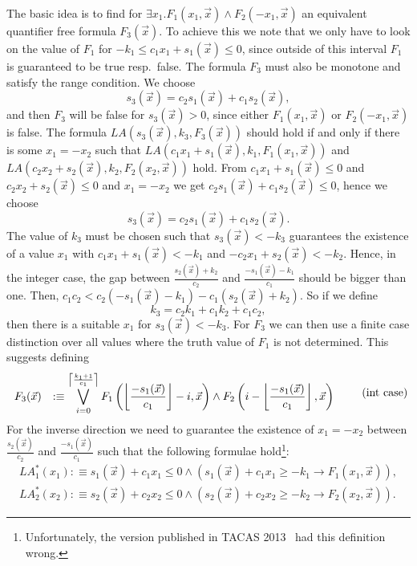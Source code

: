 \ifnewinterpolation The basic idea is to find for
 $\exists x_1. F_1(x_1, \vec x)\land F_2(-x_1, \vec x)$ an
equivalent quantifier free formula $F_3(\vec x)$.
To achieve this we note that we only have
to look on the value of $F_1$ for 
$-k_1 \leq c_1 x_1 + s_1(\vec x) \leq 0$,
since outside of this interval $F_1$ is guaranteed to be true
resp.\ false.  The formula $F_3$ must also be monotone and
satisfy the range condition.  We choose
\[ s_3(\vec x) = c_2 s_1(\vec x) + c_1s_2(\vec x), \]
and then $F_3$ will be false for $s_3(\vec x) > 0$, since either 
$F_1(x_1, \vec x)$ or $F_2(-x_1, \vec x)$ is false.
\else
The formula $LA(s_3(\vec x), k_3, F_3(\vec x))$ should
hold if and only if there is some $x_1=-x_2$ such that 
$LA(c_1x_1 + s_1(\vec x), k_1, F_1(x_1,\vec x))$ and 
$LA(c_2x_2 + s_2(\vec x), k_2, F_2(x_2,\vec x))$ hold.
From $c_1x_1 + s_1(\vec x) \leq 0$ and $c_2x_2+s_2(\vec x)\leq 0$ and $x_1=-x_2$ we get $c_2 s_1(\vec x) + c_1s_2(\vec x)\leq 0$, hence we choose
\[ s_3(\vec x) = c_2 s_1(\vec x) + c_1s_2(\vec x). \]
\fi
\ifnewinterpolation
The value of $k_3$ must be chosen such that $s_3(\vec x)<-k_3$ guarantees
the existence of a value $x_1$ with $c_1x_1 + s_1(\vec x)< -k_1$ and $-c_2x_1 + s_2(\vec x)< -k_2$.  Hence, in the integer case, the gap between
$\frac{s_2(\vec x)+k_2}{c_2}$ and $\frac{-s_1(\vec x)-k_1}{c_1}$
should be bigger than one.  Then,
$c_1c_2 < c_2(-s_1(\vec x)-k_1) - c_1(s_2(\vec x)+k_2)$.
So if we define
\[ k_3 = c_2k_1+c_1k_2+c_1c_2,\]
then there is a suitable $x_1$ for $s_3(\vec x) < - k_3$.
For $F_3$ we can then use a finite case distinction over all values where the truth value of $F_1$ is not determined.  This suggests defining
\begin{equation}
  \begin{array}{rl}
    F_3(\vec x) & :\equiv 
    \displaystyle{\bigvee_{i=0}^{\left\lceil \frac{k_1+1}{c_1} \right\rceil}
    F_1\left(\left\lfloor \frac{-s_1(\vec x)}{c_1} \right\rfloor - i, \vec x\right)
    \land F_2\left(i-\left\lfloor \frac{-s_1(\vec x)}{c_1} \right\rfloor, \vec x\right)}\\
  \end{array}
  \tag{int case}
\end{equation}
\else
For the inverse direction we need to guarantee the existence of 
$x_1=-x_2$ between $\frac{s_2(\vec x)}{c_2}$ and $\frac{-s_1(\vec x)}{c_1}$ 
such that  the following formulae hold\footnote{Unfortunately, the version published in TACAS 2013~\cite{tacaspaper} had this definition wrong.}:
\begin{align*}
LA_1^*(x_1) :\equiv s_1(\vec x) + c_1 x_1 \leq 0 \land (s_1(\vec x) + c_1 x_1 \geq -k_1 \rightarrow F_1(x_1,\vec x)),\\
LA_2^*(x_2) :\equiv s_2(\vec x) + c_2 x_2 \leq 0 \land (s_2(\vec x) + c_2 x_2 \geq -k_2 \rightarrow F_2(x_2,\vec x)).
\end{align*}

